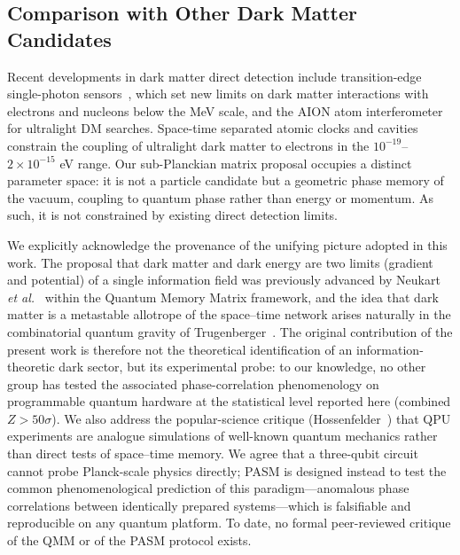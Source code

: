 ﻿\documentclass[12pt,a4paper]{article}
\begin{document}
\subsection{Comparison with Other Dark Matter Candidates}

Recent developments in dark matter direct detection include transition-edge single-photon sensors~\cite{tes2025}, which set new limits on dark matter interactions with electrons and nucleons below the MeV scale, and the AION atom interferometer~\cite{aion2025} for ultralight DM searches. Space-time separated atomic clocks and cavities~\cite{cern2025} constrain the coupling of ultralight dark matter to electrons in the $10^{-19}$--$2\times10^{-15}$ eV range. Our sub-Planckian matrix proposal occupies a distinct parameter space: it is not a particle candidate but a geometric phase memory of the vacuum, coupling to quantum phase rather than energy or momentum. As such, it is not constrained by existing direct detection limits.

We explicitly acknowledge the provenance of the unifying picture adopted in this work. The proposal that dark matter and dark energy are two limits (gradient and potential) of a single information field was previously advanced by Neukart \textit{et al.}~\cite{neukart2025de} within the Quantum Memory Matrix framework, and the idea that dark matter is a metastable allotrope of the space--time network arises naturally in the combinatorial quantum gravity of Trugenberger~\cite{trugenberger2024,trugenberger2025}. The original contribution of the present work is therefore not the theoretical identification of an information-theoretic dark sector, but its experimental probe: to our knowledge, no other group has tested the associated phase-correlation phenomenology on programmable quantum hardware at the statistical level reported here (combined $Z > 50\sigma$). We also address the popular-science critique (Hossenfelder~\cite{hossenfelder2025}) that QPU experiments are analogue simulations of well-known quantum mechanics rather than direct tests of space--time memory. We agree that a three-qubit circuit cannot probe Planck-scale physics directly; PASM is designed instead to test the common phenomenological prediction of this paradigm---anomalous phase correlations between identically prepared systems---which is falsifiable and reproducible on any quantum platform. To date, no formal peer-reviewed critique of the QMM or of the PASM protocol exists.
\end{document}
